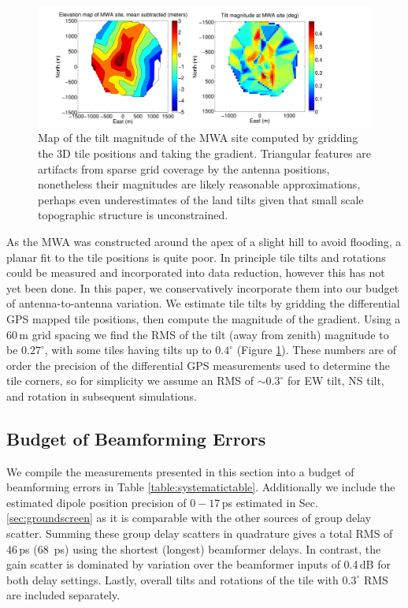 \begin{figure}[t]
\centering
\includegraphics[width=7in]{chap2_beamforming_errors/mwa_tilt_map-eps-converted-to.pdf}
\caption[Map of the tilt magnitude of the MWA site.]{Map of the tilt magnitude of the MWA site computed by gridding the 3D tile positions and taking the gradient. Triangular features are artifacts from sparse grid coverage by the antenna positions, nonetheless their magnitudes are likely reasonable approximations, perhaps even underestimates of the land tilts given that small scale topographic structure is unconstrained.}
\label{fig:mwatiletiltmap}
\end{figure}

As the MWA was constructed around the apex of a slight hill to avoid flooding, a planar fit to the tile positions is quite poor. In principle tile tilts and rotations could be measured and incorporated into data reduction, however this has not yet been done. In this paper, we conservatively incorporate them into our budget of antenna-to-antenna variation. We estimate tile tilts by gridding the differential GPS mapped tile positions, then compute the magnitude of the gradient. Using a 60\,m grid spacing we find the RMS of the tilt (away from zenith) magnitude to be $0.27^\circ$, with some tiles having tilts up to $0.4^\circ$ (Figure \ref{fig:mwatiletiltmap}). These numbers are of order the precision of the differential GPS measurements used to determine the tile corners, so for simplicity we assume an RMS of $\sim0.3^\circ$ for EW tilt, NS tilt, and rotation in subsequent simulations. 

\subsection{Budget of Beamforming Errors}
\label{sec:budget}

We compile the measurements presented in this section into a budget of beamforming errors in Table \ref{table:systematictable}. Additionally we include the estimated dipole position precision of $0-17$\,ps estimated in Sec. \ref{sec:groundscreen} as it is comparable with the other sources of group delay scatter. Summing these group delay scatters in quadrature gives a total RMS of 46\,ps (68 \,ps) using the shortest (longest) beamformer delays. In contrast, the gain scatter is dominated by variation over the beamformer inputs of 0.4\,dB for both delay settings. Lastly, overall tilts and rotations of the tile with $0.3^\circ$ RMS are included separately.

